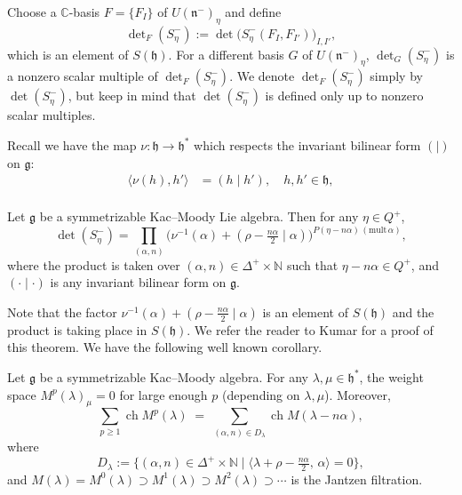 \documentclass[12pt]{article}
\begin{document}
Choose a $\mathbb{C}$-basis $F = \{F_I\}$ of $U(\mathfrak{n}^-)_{\eta}$ and define
\[
\det\nolimits_F(S^{-}_{\eta})
:= \det\bigl(S^{-}_{\eta}(F_I, F_{I'})\bigr)_{I,I'},
\]
which is an element of $S(\mathfrak{h})$. For a different basis $G$ of $U(\mathfrak{n}^-)_{\eta}$,
$\det_G(S^{-}_{\eta})$ is a nonzero scalar multiple of $\det_F(S^{-}_{\eta})$.
We denote $\det_F(S^{-}_{\eta})$ simply by $\det(S^{-}_{\eta})$,
but keep in mind that $\det(S^{-}_{\eta})$ is defined only up to nonzero scalar multiples.


Recall we have the map $\nu : \mathfrak{h} \to \mathfrak{h}^*$ which respects the invariant bilinear form $(\mid)$ on $\mathfrak{g}$:
\begin{align*}
\langle \nu(h), h' \rangle & = (h \mid h'), \quad h,h' \in \mathfrak{h}, \\
\end{align*}
\begin{theorem}
Let $\mathfrak{g}$ be a symmetrizable Kac–Moody Lie algebra.
Then for any $\eta \in Q^+$,
\[
\det(S^{-}_{\eta})
= \prod_{(\alpha,n)}
\bigl(\nu^{-1}(\alpha) +  (\rho - \tfrac{n\alpha}{2} \mid \alpha )\bigr)^{P(\eta - n\alpha)\,(\mathrm{mult}\,\alpha)},
\]
where the product is taken over $(\alpha,n) \in \Delta^+ \times \mathbb{N}$
such that $\eta - n\alpha \in Q^+$, and $(\cdot \mid \cdot)$ is any invariant bilinear form on $\mathfrak{g}$.
\end{theorem}
Note that the factor $\nu^{-1}(\alpha) +  (\rho - \tfrac{n\alpha}{2} \mid \alpha )$ is an element of $S(\mathfrak{h})$ and the product is taking place in $S(\mathfrak{h})$. We refer the reader to Kumar for a proof of this theorem. We have the following well known corollary.
\begin{corollary}
Let $\mathfrak{g}$ be a symmetrizable Kac–Moody algebra. 
For any $\lambda, \mu \in \mathfrak{h}^*$, the weight space $M^p(\lambda)_\mu = 0$
for large enough $p$ (depending on $\lambda,\mu$).
Moreover,
\begin{equation}
\sum_{p \ge 1} \operatorname{ch} M^p(\lambda)
\;=\;
\sum_{(\alpha,n)\in D_\lambda} \operatorname{ch} M(\lambda - n\alpha),
\tag{1}
\end{equation}
where 
\[
D_\lambda
:= \{ (\alpha,n) \in \Delta^+ \times \mathbb{N}
\;|\;
\langle \lambda + \rho - \tfrac{n\alpha}{2},\, \alpha \rangle = 0 \},
\]
and $M(\lambda) = M^0(\lambda) \supset M^1(\lambda) \supset M^2(\lambda) \supset \cdots$
is the Jantzen filtration.
\end{corollary}
\end{document}
